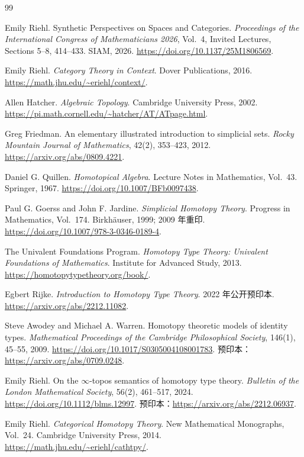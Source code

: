 \begin{thebibliography}{99}

Emily Riehl.
Synthetic Perspectives on Spaces and Categories.
\emph{Proceedings of the International Congress of Mathematicians 2026}, Vol.~4, Invited Lectures, Sections 5--8, 414--433. SIAM, 2026.
\url{https://doi.org/10.1137/25M1806569}.

Emily Riehl.
\emph{Category Theory in Context}.
Dover Publications, 2016.
\url{https://math.jhu.edu/~eriehl/context/}.

Allen Hatcher.
\emph{Algebraic Topology}.
Cambridge University Press, 2002.
\url{https://pi.math.cornell.edu/~hatcher/AT/ATpage.html}.

Greg Friedman.
An elementary illustrated introduction to simplicial sets.
\emph{Rocky Mountain Journal of Mathematics}, 42(2), 353--423, 2012.
\url{https://arxiv.org/abs/0809.4221}.

Daniel G. Quillen.
\emph{Homotopical Algebra}.
Lecture Notes in Mathematics, Vol.~43. Springer, 1967.
\url{https://doi.org/10.1007/BFb0097438}.

Paul G. Goerss and John F. Jardine.
\emph{Simplicial Homotopy Theory}.
Progress in Mathematics, Vol.~174. Birkh\"auser, 1999; 2009 年重印.
\url{https://doi.org/10.1007/978-3-0346-0189-4}.

The Univalent Foundations Program.
\emph{Homotopy Type Theory: Univalent Foundations of Mathematics}.
Institute for Advanced Study, 2013.
\url{https://homotopytypetheory.org/book/}.

Egbert Rijke.
\emph{Introduction to Homotopy Type Theory}.
2022 年公开预印本.
\url{https://arxiv.org/abs/2212.11082}.

Steve Awodey and Michael A. Warren.
Homotopy theoretic models of identity types.
\emph{Mathematical Proceedings of the Cambridge Philosophical Society}, 146(1), 45--55, 2009.
\url{https://doi.org/10.1017/S0305004108001783}.
预印本：\url{https://arxiv.org/abs/0709.0248}.

Emily Riehl.
On the $\infty$-topos semantics of homotopy type theory.
\emph{Bulletin of the London Mathematical Society}, 56(2), 461--517, 2024.
\url{https://doi.org/10.1112/blms.12997}.
预印本：\url{https://arxiv.org/abs/2212.06937}.

Emily Riehl.
\emph{Categorical Homotopy Theory}.
New Mathematical Monographs, Vol.~24. Cambridge University Press, 2014.
\url{https://math.jhu.edu/~eriehl/cathtpy/}.


\end{thebibliography}
